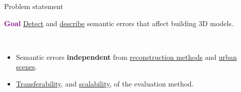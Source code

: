 \documentclass[10pt, export]{beamer}
\begin{document}
        \begin{frame}{Problem statement}
            \begin{block}{\textcolor{purple}{\textbf{Goal}}}
                \underline{Detect} and \underline{describe} semantic errors that affect building 3D models.
            \end{block}
            ~\\
            \begin{itemize}[label=$\blacktriangleright$, font=\color{IGNGreen}, itemsep=2em]
                \item<2-> Semantic errors \textbf{independent} from \underline{reconstruction methods} and \underline{urban scenes}.
                \item<3-> \underline{Transferability}, and \underline{scalability}, of the evaluation method.
            \end{itemize}
        \end{frame}
\end{document}
